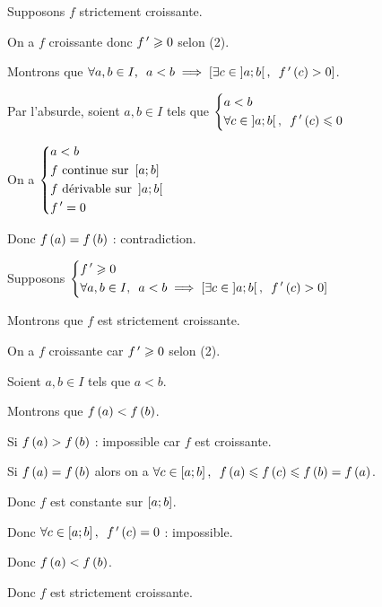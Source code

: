 \begin{dem}[4]
\impdir

Supposons \(f\) strictement croissante.

On a \(f\) croissante donc \(f^{\,\prime}\geqslant0\) selon (2).

Montrons que \(\quantifs{\forall a,b\in I}a<b\imp\croch{\quantifs{\exists c\in\intervee{a}{b}}f\prim\paren{c}>0}\).

Par l'absurde, soient \(a,b\in I\) tels que \(\begin{dcases}a<b \\ \quantifs{\forall c\in\intervee{a}{b}}f\prim\paren{c}\leq0\end{dcases}\)

On a \(\begin{dcases}a<b \\ f\text{ continue sur }\left[a;b\right] \\ f\text{ dérivable sur }\left]a;b\right[ \\ f^{\,\prime}=0\end{dcases}\)

Donc \(f\left(a\right)=f\left(b\right)\) : contradiction.

\imprec

Supposons \(\begin{dcases}f\prim\geq0 \\ \quantifs{\forall a,b\in I}a<b\imp\croch{\quantifs{\exists c\in\intervee{a}{b}}f\prim\paren{c}>0}\end{dcases}\)

Montrons que \(f\) est strictement croissante.

On a \(f\) croissante car \(f^{\,\prime}\geqslant0\) selon (2).

Soient \(a,b\in I\) tels que \(a<b\).

Montrons que \(f\left(a\right)<f\left(b\right)\).

Si \(f\left(a\right)>f\left(b\right)\) : impossible car \(f\) est croissante.

Si \(f\left(a\right)=f\left(b\right)\) alors on a \(\quantifs{\forall c\in\intervii{a}{b}}f\paren{a}\leq f\paren{c}\leq f\paren{b}=f\paren{a}\).

Donc \(f\) est constante sur \(\left[a;b\right]\).

Donc \(\quantifs{\forall c\in\intervii{a}{b}}f\prim\paren{c}=0\) : impossible.

Donc \(f\left(a\right)<f\left(b\right)\).

Donc \(f\) est strictement croissante.
\end{dem}

